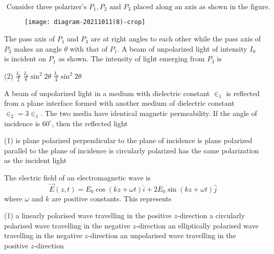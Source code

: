 \begin{enumerate}
\begin{minipage}{\textwidth}
	\item $\text { Consider three polarizer's } P_{1}, P_{2} \text { and } P_{3} \text { placed along an axis as shown in the figure. }$\\
	\begin{figure}[H]
		\centering
		\texttt{[image: diagram-20211011(8)-crop]}
	\end{figure}
	The pass axis of $P_{1}$ and $P_{3}$ are at right angles to each other while the pass axis of $P_{2}$ makes an angle $\theta$ with that of $P_{1}$. A beam of unpolarized light of intensity $I_{0}$ is incident on $P_{1}$ as shown. The intensity of light emerging from $P_{3}$ is
\end{minipage}
\begin{tasks}(2)
	\task[\textbf{B.}] $\frac{I_{0}}{2}$
	\task[\textbf{C.}]$\frac{I_{0}}{8} \sin ^{2} 2 \theta$
	\task[\textbf{D.}]$\frac{I_{0}}{4} \sin ^{2} 2 \theta$
\end{tasks}
\begin{minipage}{\textwidth}
	\item A beam of unpolarized light in a medium with dielectric constant $\in_{1}$ is reflected from a plane interface formed with another medium of dielectric constant $\in_{2}=3 \in_{1}$. The two media have identical magnetic permeability. If the angle of incidence is $60^{\circ}$, then the reflected light
\end{minipage}
\begin{tasks}(1)
	\task[\textbf{A.}] is plane polarized perpendicular to the plane of incidence
	\task[\textbf{B.}] is plane polarized parallel to the plane of incidence
	\task[\textbf{C.}]is circularly polarized
	\task[\textbf{D.}] has the same polarization as the incident light
\end{tasks}
\begin{minipage}{\textwidth}
	\item The electric field of an electromagnetic wave is
	$$
	\vec{E}(z, t)=E_{0} \cos (k z+\omega t) \hat{i}+2 E_{0} \sin (k z+\omega t) \hat{j}
	$$
	where $\omega$ and $k$ are positive constants. This represents
\end{minipage}
\begin{tasks}(1)
	\task[\textbf{A.}] a linearly polarised wave travelling in the positive $z$-direction
	\task[\textbf{B.}]a circularly polarised wave travelling in the negative $z$-direction
	\task[\textbf{C.}]an elliptically polarised wave travelling in the negative $z$-direction
	\task[\textbf{D.}] an unpolarised wave travelling in the positive $z$-direction
\end{tasks}
\end{enumerate}
